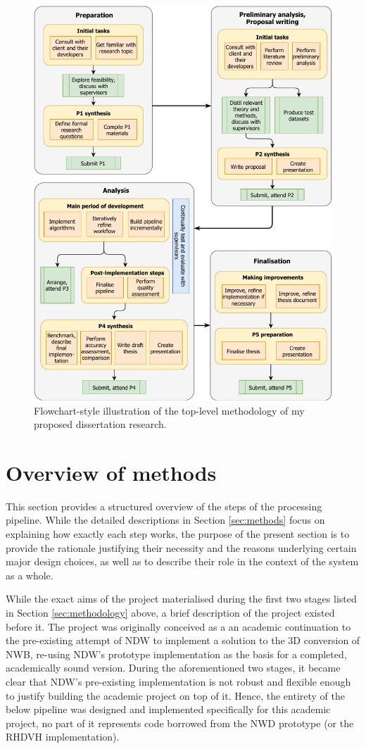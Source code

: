 \begin{figure}
    \centering
    \includegraphics[width=0.9\linewidth]{final_report/figs/methodology.pdf}
    \caption{Flowchart-style illustration of the top-level methodology of my proposed dissertation research.}
    \label{fig:methodflow}
\end{figure}

\section{Overview of methods}
\label{sec:methodsoverview}

This section provides a structured overview of the steps of the processing pipeline. While the detailed descriptions in Section \ref{sec:methods} focus on explaining how exactly each step works, the purpose of the present section is to provide the rationale justifying their necessity and the reasons underlying certain major design choices, as well as to describe their role in the context of the system as a whole.

While the exact aims of the project materialised during the first two stages listed in Section \ref{sec:methodology} above, a brief description of the project existed before it. The project was originally conceived as a an academic continuation to the pre-existing attempt of NDW to implement a solution to the 3D conversion of NWB, re-using NDW's prototype implementation as the basis for a completed, academically sound version. During the aforementioned two stages, it became clear that NDW's pre-existing implementation is not robust and flexible enough to justify building the academic project on top of it. Hence, the entirety of the below pipeline was designed and implemented specifically for this academic project, no part of it represents code borrowed from the NWD prototype (or the RHDVH implementation).


